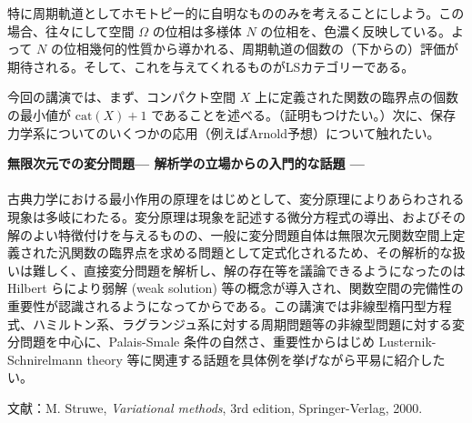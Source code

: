 \documentclass[uplatex,dvipdfmx]{jlreq}
\begin{document}
特に周期軌道としてホモトピー的に自明なもののみを考えることにしよう。この場合、往々にして空間 $\Omega$ の位相は多様体 $N$ の位相を、色濃く反映している。よって $N$ の位相幾何的性質から導かれる、周期軌道の個数の（下からの）評価が期待される。そして、これを与えてくれるものがLSカテゴリーである。

今回の講演では、まず、コンパクト空間 $X$ 上に定義された関数の臨界点の個数の最小値が $\mathrm{cat}(X)+1$ であることを述べる。（証明もつけたい。）次に、保存力学系についてのいくつかの応用（例えばArnold予想）について触れたい。

\newpage
\noindent
{\large\bfseries 無限次元での変分問題\quad --- 解析学の立場からの入門的な話題 ---}\\
~\hspace*{\fill}{\large\bfseries 田中 和永（早稲田大学理工学部数理科学科）}\\

古典力学における最小作用の原理をはじめとして、変分原理によりあらわされる現象は多岐にわたる。変分原理は現象を記述する微分方程式の導出、およびその解のよい特徴付けを与えるものの、一般に変分問題自体は無限次元関数空間上定義された汎関数の臨界点を求める問題として定式化されるため、その解析的な扱いは難しく、直接変分問題を解析し、解の存在等を議論できるようになったのは Hilbert らにより弱解 (weak solution) 等の概念が導入され、関数空間の完備性の重要性が認識されるようになってからである。この講演では非線型楕円型方程式、ハミルトン系、ラグランジュ系に対する周期問題等の非線型問題に対する変分問題を中心に、Palais-Smale 条件の自然さ、重要性からはじめ Lusternik-Schnirelmann theory 等に関連する話題を具体例を挙げながら平易に紹介したい。

\medskip

\noindent
文献：\quad M. Struwe, \textit{Variational methods}, 3rd edition, Springer-Verlag, 2000.
\end{document}
